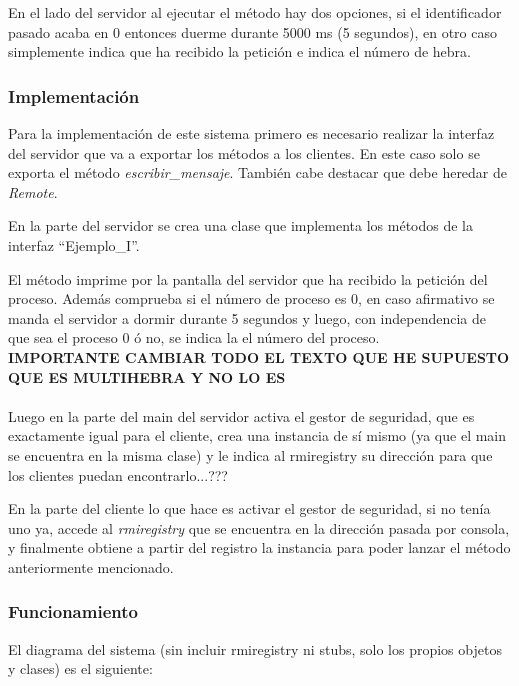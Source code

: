 \documentclass{article}
\begin{document}
En el lado del servidor al ejecutar el método hay dos opciones, si el identificador pasado acaba en 0 entonces duerme durante 5000 ms (5 segundos), en otro caso simplemente indica que ha recibido la petición e indica el número de hebra.



\subsubsection{Implementación}
Para la implementación de este sistema primero es necesario realizar la interfaz del servidor que va a exportar los métodos a los clientes. En este caso solo se exporta el método \textit{escribir\_mensaje}. También cabe destacar que debe heredar de \textit{Remote}.

En la parte del servidor se crea una clase que implementa los métodos de la interfaz ``Ejemplo\_I''.

El método imprime por la pantalla del servidor que ha recibido la petición del proceso. Además comprueba si el número de proceso es 0, en caso afirmativo se manda el servidor a dormir durante 5 segundos y luego, con independencia de que sea el proceso 0 ó no, se indica la el número del proceso.
\\

\textbf{IMPORTANTE CAMBIAR TODO EL TEXTO QUE HE SUPUESTO QUE ES MULTIHEBRA Y NO LO ES}
\\\\
Luego en la parte del main del servidor activa el gestor de seguridad, que es exactamente igual para el cliente, crea una instancia de sí mismo (ya que el main se encuentra en la misma clase) y le indica al rmiregistry su dirección para que los clientes puedan encontrarlo...???

En la parte del cliente lo que hace es activar el gestor de seguridad, si no tenía uno ya, accede al \textit{rmiregistry} que se encuentra en la dirección pasada por consola, y finalmente obtiene a partir del registro la instancia para poder lanzar el método anteriormente mencionado.


\subsubsection{Funcionamiento}
El diagrama del sistema (sin incluir rmiregistry ni stubs, solo los propios objetos y clases) es el siguiente:
\end{document}
